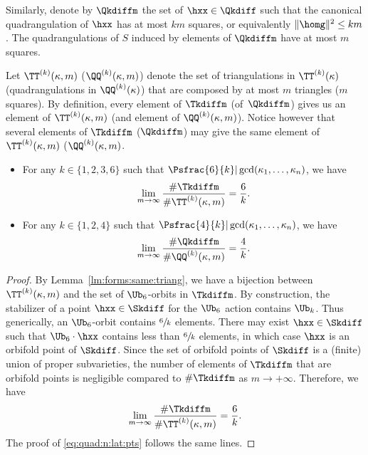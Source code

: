 Similarly, denote by $\Qkdiffm$ the set of $\hxx\in \Qkdiff$ such that the canonical quadrangulation of $\hxx$ has at most $km$ squares, or equivalently $\|\homg\|^2 \leq km$. The quadrangulations of $S$ induced by elements of $\Qkdiffm$ have at most $m$ squares.

Let $\TT^{(k)}(\kappa,m)$ (\resp $\QQ^{(k)}(\kappa,m)$) denote the set of triangulations in $\TT^{(k)}(\kappa)$ (\resp quadrangulations in $\QQ^{(k)}(\kappa)$) that are composed by at most $m$ triangles (\resp $m$ squares). By definition, every element of $\Tkdiffm$ (\resp of~$\Qkdiffm$) gives us an element of $\TT^{(k)}(\kappa,m)$ (\resp and element of $\QQ^{(k)}(\kappa,m)$). Notice however that several elements of $\Tkdiffm$ (\resp $\Qkdiffm$) may give the same element of $\TT^{(k)}(\kappa,m)$ (\resp $\QQ^{(k)}(\kappa,m)$.

\skpt
\begin{Proposition}\label{prop:triang:n:lat:pts}
\begin{itemize}
\item
For any $k \in \{1,2,3,6\}$ such that $\Psfrac{6}{k} | \gcd(\kappa_1,\dots,\kappa_n)$, we have%
\begin{equation}\label{eq:triang:n:lat:pts}
\lim_{m\to \infty}\frac{\#\Tkdiffm}{\#\TT^{(k)}(\kappa,m)}=\frac{6}{k}.
\end{equation}

\item
For any $k\in \{1,2,4\}$ such that $\Psfrac{4}{k} | \gcd(\kappa_1,\dots,\kappa_n)$, we have
\begin{equation}\label{eq:quad:n:lat:pts}
\lim_{m\to \infty}\frac{\#\Qkdiffm}{\#\QQ^{(k)}(\kappa,m)}=\frac{4}{k}.
\end{equation}
\end{itemize}
\end{Proposition}

\begin{proof}
By Lemma~\ref{lm:forms:same:triang}, we have a bijection between $\TT^{(k)}(\kappa,m)$ and the set of $\Ub_6$\nobreakdash-orbits in $\Tkdiffm$.
By construction, the stabilizer of a point $\hxx\in \Skdiff$ for the $\Ub_6$ action contains $\Ub_k$. Thus generically, an $\Ub_6$-orbit contains $\sfrac{6}{k}$ elements. There may exist $\hxx\in \Skdiff$ such that $\Ub_6\cdot\hxx$ contains less than $\sfrac{6}{k}$ elements, in which case $\hxx$ is an orbifold point of $\Skdiff$. Since the set of orbifold points of $\Skdiff$ is a (finite) union of proper subvarieties, the number of elements of $\Tkdiffm$ that are orbifold points is negligible compared to $\#\Tkdiffm$ as $m\to +\infty$. Therefore, we have
\[
\lim_{m\to \infty}\frac{\#\Tkdiffm}{\#\TT^{(k)}(\kappa,m)}=\frac{6}{k}.
\]
The proof of \eqref{eq:quad:n:lat:pts} follows the same lines.
\end{proof}

